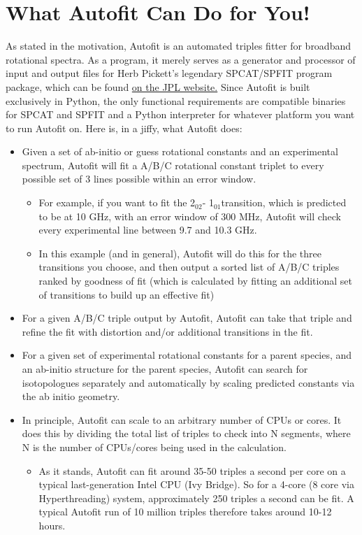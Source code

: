 \documentclass[letterpaper,10pt,english]{sphinxmanual}
\begin{document}
\section{What Autofit Can Do for You!}
\label{intro:what-autofit-can-do-for-you}
As stated in the motivation, Autofit is an automated triples fitter for broadband rotational spectra. As a program, it merely serves as a generator and processor of input and output files
for Herb Pickett's legendary SPCAT/SPFIT program package, which can be found  \href{http://spec.jpl.nasa.gov/}{on the JPL website.}
Since Autofit is built exclusively in Python, the only functional requirements are compatible binaries for SPCAT and SPFIT and a Python interpreter for whatever platform you want to run Autofit on.
Here is, in a jiffy, what Autofit does:
\begin{itemize}
\item {} 
Given a set of ab-initio or guess rotational constants and an experimental spectrum, Autofit will fit a A/B/C rotational constant triplet to every possible set of 3 lines possible within an error window.
\begin{itemize}
\item {} 
For example, if you want to fit the 2$_{\text{02}}$- 1$_{\text{01}}$transition, which is predicted to be at 10 GHz, with an error window of 300 MHz, Autofit will check every experimental line between 9.7 and 10.3 GHz.

\item {} 
In this example (and in general), Autofit will do this for the three transitions you choose, and then output a sorted list of A/B/C triples ranked by goodness of fit (which is calculated by fitting an additional set of transitions to build up an effective fit)

\end{itemize}

\item {} 
For a given A/B/C triple output by Autofit, Autofit can take that triple and refine the fit with distortion and/or additional transitions in the fit.

\item {} 
For a given set of experimental rotational constants for a parent species, and an ab-initio structure for the parent species, Autofit can search for isotopologues separately and automatically by scaling predicted constants via the ab initio geometry.

\item {} 
In principle, Autofit can scale to an arbitrary number of CPUs or cores. It does this by dividing the total list of triples to check into N segments, where N is the number of CPUs/cores being used in the calculation.
\begin{itemize}
\item {} 
As it stands, Autofit can fit around 35-50 triples a second per core on a typical last-generation Intel CPU (Ivy Bridge). So for a 4-core (8 core via Hyperthreading) system, approximately 250 triples a second can be fit. A typical Autofit run of 10 million triples therefore takes around 10-12 hours.


\end{itemize}
\end{itemize}
\end{document}
